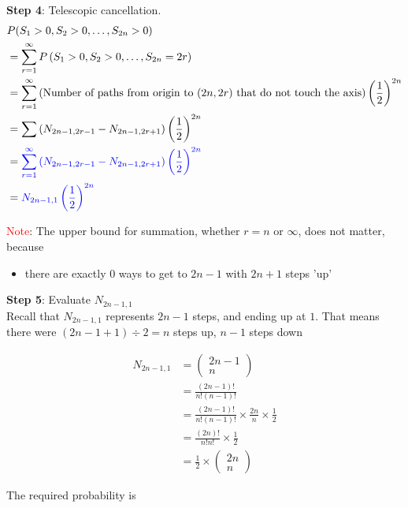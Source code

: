 \textbf{Step 4}: Telescopic cancellation.
\begin{align*}
  &P(S_1 > 0, S_2 > 0, \hdots, S_{2n} > 0) \\
  &= \sum_{r = 1}^{\infty} P \left( S_1 > 0, S_2 > 0, \hdots, S_{2n} = 2r \right) \\
  &= \sum_{r = 1}^{\infty} \left( \text{Number of paths from origin to $(2n, 2r)$ that do not touch the axis} \right)  \left( \frac{1}{2} \right)^{2n} \\
  &= \sum \left( N_{2n-1, 2r-1} - N_{2n -1, 2r + 1} \right)  \left( \frac{1}{2} \right)^{2n} \\
  &= \textcolor{blue}{
    \sum_{r =1}^{\infty} \left( N_{2n-1, 2r-1} - N_{2n -1, 2r + 1} \right)  \left( \frac{1}{2} \right)^{2n}
  } \\
  &= \textcolor{blue}{
    N_{2n -1, 1} \left( \frac{1}{2} \right)^{2n}
  }
\end{align*}

\textcolor{red}{Note}: The upper bound for summation, whether $r = n$ or $\infty$, does not matter, because
\begin{itemize}
  \item there are exactly $0$ ways to get to $2n -1$ with $2n+1$ steps 'up'
\end{itemize}

\textbf{Step 5}: Evaluate $N_{2n -1, 1}$ \\

Recall that $N_{2n -1, 1}$ represents $2n - 1$ steps, and ending up at $1$. That means there were $(2n - 1 + 1) \div 2 = n$ steps up, $n - 1$ steps down

\begin{align*}
  N_{2n - 1, 1} &= \begin{pmatrix} 2n -1 \\ n \end{pmatrix}  \\
  &= \frac{(2n-1)!}{n! (n-1)!} \\
  &= \frac{(2n-1)!}{n! (n-1)!} \times \frac{2n}{n} \times \frac{1}{2} \\
  &= \frac{(2n)!}{n! n!} \times \frac{1}{2} \\
  &= \frac{1}{2} \times \begin{pmatrix} 2n \\ n \end{pmatrix} 
\end{align*}

The required probability is

